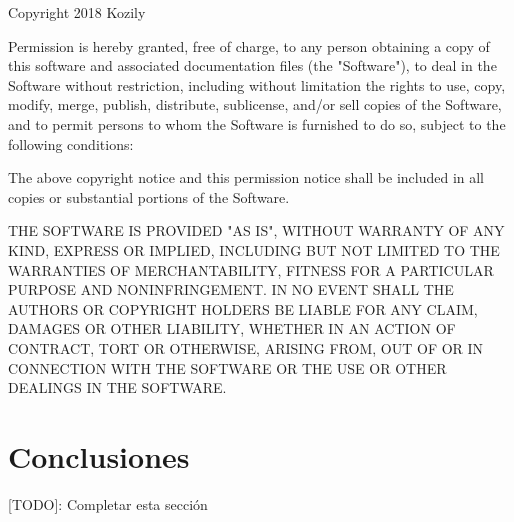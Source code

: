 \documentclass[a4paper,11pt]{article}
\begin{document}
\begin{displayquote}

Copyright 2018 Kozily

Permission is hereby granted, free of charge, to any person obtaining a copy of this software and associated documentation files (the "Software"), to deal in the Software without restriction, including without limitation the rights to use, copy, modify, merge, publish, distribute, sublicense, and/or sell copies of the Software, and to permit persons to whom the Software is furnished to do so, subject to the following conditions:

The above copyright notice and this permission notice shall be included in all copies or substantial portions of the Software.

THE SOFTWARE IS PROVIDED "AS IS", WITHOUT WARRANTY OF ANY KIND, EXPRESS OR IMPLIED, INCLUDING BUT NOT LIMITED TO THE WARRANTIES OF MERCHANTABILITY, FITNESS FOR A PARTICULAR PURPOSE AND NONINFRINGEMENT. IN NO EVENT SHALL THE AUTHORS OR COPYRIGHT HOLDERS BE LIABLE FOR ANY CLAIM, DAMAGES OR OTHER LIABILITY, WHETHER IN AN ACTION OF CONTRACT, TORT OR OTHERWISE, ARISING FROM, OUT OF OR IN CONNECTION WITH THE SOFTWARE OR THE USE OR OTHER DEALINGS IN THE SOFTWARE.

\end{displayquote}

\section{Conclusiones}

[TODO]: Completar esta sección
\end{document}
